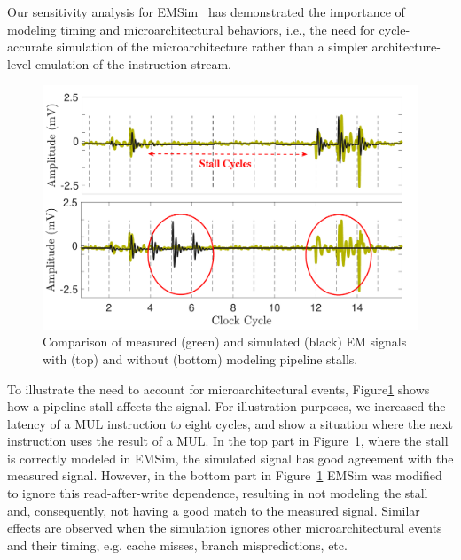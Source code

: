 Our sensitivity analysis for EMSim~\cite{Nader2020} has demonstrated the importance of modeling timing and microarchitectural behaviors, i.e., the need for cycle-accurate simulation of the microarchitecture rather than a simpler architecture-level emulation of the instruction stream.

\begin{figure}
	\centering
		\vspace{-0.15in}
	\includegraphics[width=0.45\columnwidth,clip]{figure/stall2.pdf}
	\vspace{-0.3in}
	\caption{Comparison of measured (green) and simulated (black) EM signals with (top) and without (bottom) modeling pipeline stalls.}
	\label{fig:stall}
\end{figure}
To illustrate the need to account for microarchitectural events, Figure\ref{fig:stall} shows how a pipeline stall affects the signal. For illustration purposes, we increased the latency of a MUL instruction to eight cycles, and show a situation where the next instruction uses the result of a MUL. In the top part in Figure~\ref{fig:stall}, where the stall is correctly modeled in EMSim, the simulated signal has good agreement with the measured signal. However, in the bottom part in Figure~\ref{fig:stall} EMSim was modified to ignore this read-after-write dependence, resulting in not modeling the stall and, consequently, not having a good match to the measured signal.
Similar effects are observed when the simulation ignores other microarchitectural events and their timing, e.g. cache misses, branch mispredictions, etc.

